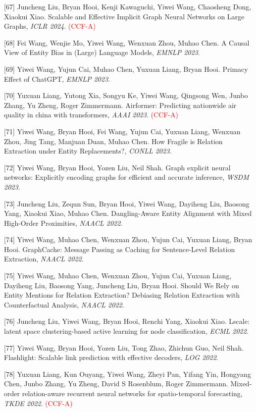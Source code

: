 [67] Juncheng Liu, Bryan Hooi, Kenji Kawaguchi, Yiwei Wang, Chaosheng Dong, Xiaokui Xiao. Scalable and Effective Implicit Graph Neural Networks on Large Graphs, \textit{ICLR 2024}. \textcolor{red}{(CCF-A)}

[68] Fei Wang, Wenjie Mo, Yiwei Wang, Wenxuan Zhou, Muhao Chen. A Causal View of Entity Bias in (Large) Language Models, \textit{EMNLP 2023}.

[69] Yiwei Wang, Yujun Cai, Muhao Chen, Yuxuan Liang, Bryan Hooi. Primacy Effect of ChatGPT, \textit{EMNLP 2023}.

[70] Yuxuan Liang, Yutong Xia, Songyu Ke, Yiwei Wang, Qingsong Wen, Junbo Zhang, Yu Zheng, Roger Zimmermann. Airformer: Predicting nationwide air quality in china with transformers, \textit{AAAI 2023}. \textcolor{red}{(CCF-A)}

[71] Yiwei Wang, Bryan Hooi, Fei Wang, Yujun Cai, Yuxuan Liang, Wenxuan Zhou, Jing Tang, Manjuan Duan, Muhao Chen. How Fragile is Relation Extraction under Entity Replacements?, \textit{CONLL 2023}.

[72] Yiwei Wang, Bryan Hooi, Yozen Liu, Neil Shah. Graph explicit neural networks: Explicitly encoding graphs for efficient and accurate inference, \textit{WSDM 2023}.

[73] Juncheng Liu, Zequn Sun, Bryan Hooi, Yiwei Wang, Dayiheng Liu, Baosong Yang, Xiaokui Xiao, Muhao Chen. Dangling-Aware Entity Alignment with Mixed High-Order Proximities, \textit{NAACL 2022}.

[74] Yiwei Wang, Muhao Chen, Wenxuan Zhou, Yujun Cai, Yuxuan Liang, Bryan Hooi. GraphCache: Message Passing as Caching for Sentence-Level Relation Extraction, \textit{NAACL 2022}.

[75] Yiwei Wang, Muhao Chen, Wenxuan Zhou, Yujun Cai, Yuxuan Liang, Dayiheng Liu, Baosong Yang, Juncheng Liu, Bryan Hooi. Should We Rely on Entity Mentions for Relation Extraction? Debiasing Relation Extraction with Counterfactual Analysis, \textit{NAACL 2022}.

[76] Juncheng Liu, Yiwei Wang, Bryan Hooi, Renchi Yang, Xiaokui Xiao. Lscale: latent space clustering-based active learning for node classification, \textit{ECML 2022}.

[77] Yiwei Wang, Bryan Hooi, Yozen Liu, Tong Zhao, Zhichun Guo, Neil Shah. Flashlight: Scalable link prediction with effective decoders, \textit{LOG 2022}.

[78] Yuxuan Liang, Kun Ouyang, Yiwei Wang, Zheyi Pan, Yifang Yin, Hongyang Chen, Junbo Zhang, Yu Zheng, David S Rosenblum, Roger Zimmermann. Mixed-order relation-aware recurrent neural networks for spatio-temporal forecasting, \textit{TKDE 2022}. \textcolor{red}{(CCF-A)}

